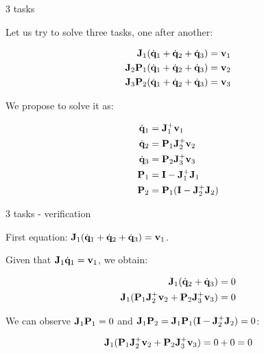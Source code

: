 \documentclass{beamer}
\newcommand{\dq} {\dot{\mathbf{q}}}
\begin{document}
\begin{frame}{3 tasks}
	\begin{flushleft}
		
		Let us try to solve three tasks, one after another:
		
		\begin{align}
			\bo{J}_1 (\dq_1 + \dq_2 + \dq_3) = \bo{v}_1 \\
			\bo{J}_2 \bo{P}_1 (\dq_1 + \dq_2 + \dq_3) = \bo{v}_2 \\
			\bo{J}_3 \bo{P}_2 (\dq_1 + \dq_2 + \dq_3) = \bo{v}_3
		\end{align}
		
		We propose to solve it as:
		
		\begin{align}
	\dq_1 &= \bo{J}_1^+ \bo{v}_1 \\
	\dq_2 &= \bo{P}_1 \bo{J}_2^+ \bo{v}_2 \\
	\dq_3 &= \bo{P}_2 \bo{J}_3^+ \bo{v}_3 \\
	\bo{P}_1 & =\bo{I} - \bo{J}_1^+\bo{J}_1 \\
	\bo{P}_2 & =\bo{P}_1 (\bo{I} - \bo{J}_2^+\bo{J}_2)
		\end{align}		
		
	\end{flushleft}
\end{frame}



\begin{frame}{3 tasks - verification}
	\begin{flushleft}
		
		First equation: $\bo{J}_1 (\dq_1 + \dq_2 + \dq_3) = \bo{v}_1$.
		
		\bigskip
		
		Given that $\bo{J}_1 \dq_1 = \bo{v}_1$, we obtain:
		
		\begin{align}
			\bo{J}_1 (\dq_2 + \dq_3) = 0 \\
			\bo{J}_1 (\bo{P}_1 \bo{J}_2^+ \bo{v}_2 
			+ 
			\bo{P}_2 \bo{J}_3^+ \bo{v}_3) = 0 
		\end{align}
		
		We can observe $\mathbf{J}_1 \mathbf{P}_1 = 0$ and $\mathbf{J}_1 \mathbf{P}_2 =\mathbf{J}_1 \mathbf{P}_1 (\mathbf{I} - \mathbf{J}_2^+\mathbf{J}_2)  = 0$:
		
		\begin{align}
			\mathbf{J}_1 (\mathbf{P}_1 \mathbf{J}_2^+ \mathbf{v}_2 
			+ 
			\mathbf{P}_2 \mathbf{J}_3^+ \mathbf{v}_3) = 0 + 0 = 0
		\end{align}
		
	\end{flushleft}
\end{frame}
\end{document}
